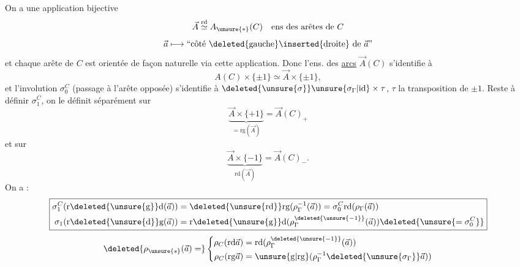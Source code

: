 On a une application bijective
\[
\vec A\overset{\mathrm{rd}}{\simeq}A_{\unsure{*}}(C)\quad\text{ens des arêtes de }C
\]
\[
\vec a\longmapsto\text{``côté \deleted{gauche}\inserted{droite} de $\vec a$''}
\]
et chaque arête de $C$ est orientée de façon naturelle via cette application. Donc l'ens. des \uline{arcs} $\vec A(C)$ s'identifie à
\[
A(C)\times\{\pm1\}\simeq\vec A\times\{\pm1\},
\]
et l'involution $\sigma_0^C$ (passage à l'arête opposée) s'identifie à $\deleted{\unsure{\sigma}}\unsure{\sigma_\Gamma|\mathrm{id}}\times\tau$, $\tau$ la transposition de $\pm1$. Reste à définir $\sigma_1^C$, on le définit séparément sur
\[
\underbrace{\vec A\times\{+1\}}_{=\mathrm{rg}(\vec A)}=\vec A(C)_+
\]
et sur
\[
\underbrace{\vec A\times\{-1\}}_{\mathrm{rd}(\vec A)}=\vec A(C)_-.
\]
On a :
\[
\boxed{\begin{aligned}
\sigma_1^C(\mathrm r\deleted{\unsure{\mathrm g}}\mathrm d(\vec a))&=\deleted{\unsure{\mathrm{rd}}}\mathrm{rg}(\rho_\Gamma^{-1}(\vec a))=\sigma_0^C\mathrm{rd}(\rho_\Gamma(\vec a))\\
\sigma_1(\mathrm r\deleted{\unsure{\mathrm d}}\mathrm g(\vec a))&=\mathrm r\deleted{\unsure{\mathrm g}}\mathrm d(\rho_\Gamma^{\deleted{\unsure{-1}}}(\vec a))\deleted{\unsure{=\sigma_0^C}}
\end{aligned}}
\]
\[
\deleted{\rho_{\unsure{s}}(\vec a)=}
\left\{\begin{aligned}
\rho_C(\mathrm{rd}\vec a)&=\mathrm{rd}(\rho_\Gamma^{\deleted{\unsure{-1}}}(\vec a))\\
\rho_C(\mathrm{rg}\vec a)&=\unsure{\mathrm g|\mathrm{rg}}(\rho_\Gamma^{-1}\deleted{\unsure{\sigma_\Gamma}}\vec a))
\end{aligned}\right.
\]

